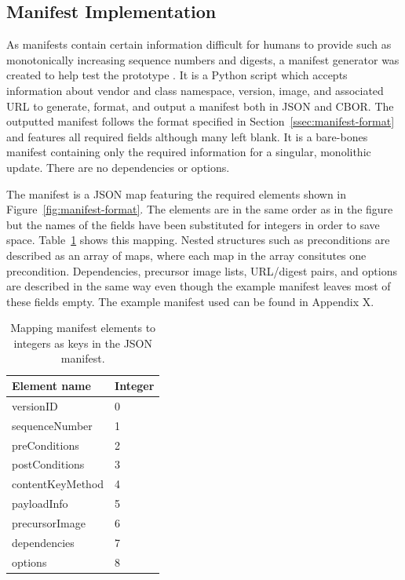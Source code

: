 \documentclass[0-thesis.tex]{subfiles}
\begin{document}
\subsection{Manifest Implementation}
\label{ssec:manifest-implementation}
As manifests contain certain information difficult for humans to provide such as
monotonically increasing sequence numbers and digests, a manifest generator was created to
help test the prototype \parencite{manifest-generator}. It is a Python script which
accepts information about vendor and class namespace, version, image, and associated URL
to generate, format, and output a manifest both in JSON and CBOR. The outputted manifest
follows the format specified in Section~\ref{ssec:manifest-format} and features all
required fields although many left blank. It is a bare-bones manifest containing only the
required information for a singular, monolithic update. There are no dependencies or
options. 

The manifest is a JSON map featuring the required elements shown in
Figure~\ref{fig:manifest-format}. The elements are in the same order as in the figure but
the names of the fields have been substituted for integers in order to save space.
Table~\ref{tab:manifest-substitution} shows this mapping. Nested structures such as
preconditions are described as an array of maps, where each map in the array consitutes
one precondition. Dependencies, precursor image lists, URL/digest pairs, and options are
described in the same way even though the example manifest leaves most of these fields
empty. The example manifest used can be found in Appendix X. 

\begin{longtable}[]{@{}ll@{}}
    \caption{Mapping manifest elements to integers as keys in the JSON manifest.}
    \label{tab:manifest-substitution}\\
    \toprule
    Element name & Integer\tabularnewline
    \midrule
    \endhead
    versionID & 0\tabularnewline
    sequenceNumber & 1\tabularnewline
    preConditions & 2\tabularnewline
    postConditions & 3\tabularnewline
    contentKeyMethod & 4\tabularnewline
    payloadInfo & 5\tabularnewline
    precursorImage & 6\tabularnewline
    dependencies & 7\tabularnewline
    options & 8\tabularnewline
    \bottomrule
\end{longtable}
    

\end{document}
